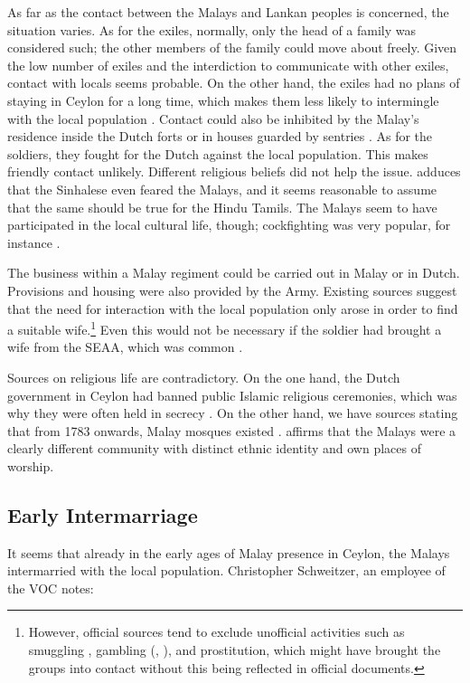 As far as the contact between the Malays and Lankan peoples is concerned, the situation varies. As for the exiles, normally, only the head of a family was considered such; the other members of the family could move about freely. Given the low number of exiles and the interdiction to communicate with other exiles, contact with locals seems probable. On the other hand, the exiles had no plans of staying in Ceylon for a long time, which makes them less likely to intermingle with the local population \citep[cf.][160]{Muysken2001sla}. Contact could also be inhibited by the Malay's residence inside the Dutch forts or in houses guarded by sentries \citep[43]{Hussainmiya1987}.
As for the soldiers, they fought for the Dutch against the local population. This makes friendly contact unlikely.  Different religious beliefs did not help the issue. \citet[cf.][51]{Hussainmiya1987} adduces that the Sinhalese even feared the Malays, and it seems reasonable to assume that the same should be true for the Hindu Tamils.
The Malays seem to have participated in the local cultural life, though; cockfighting was very popular, for instance \citep[131]{Pieris1918}.

The business within a Malay regiment could be carried out in Malay or in Dutch. Provisions and housing were also provided by the Army. Existing sources suggest that the need for interaction with the local population only arose in order to find a suitable wife.\footnote{However,
 official sources tend to exclude unofficial activities such as smuggling \citep[68]{Pieris1918}, gambling (\citet[131]{Pieris1918}, \citet[106]{Schweitzer1931}), and prostitution, which might have brought the groups into contact without this being reflected in official documents.}
Even this would not be necessary if the soldier had brought a wife from the SEAA, which was common \citep[cf.][50]{Hussainmiya1987}.


Sources on religious life are contradictory. On the one hand, the Dutch government in Ceylon  had banned public Islamic religious ceremonies, which was why they were often held in secrecy  \citep[46]{Hussainmiya1987}. On  the other hand, we have sources stating that from 1783 onwards, Malay mosques existed \citep[9]{Bichsel}. \citet[11]{Bichsel} affirms that the Malays were a clearly different community with distinct ethnic identity and own places of worship.

\subsection{Early Intermarriage}\label{sec:slmbg:EarlyIntermarriage}
It seems that already in the early ages of Malay presence in Ceylon, the Malays intermarried with the local population. Christopher Schweitzer, an employee of the VOC notes:

